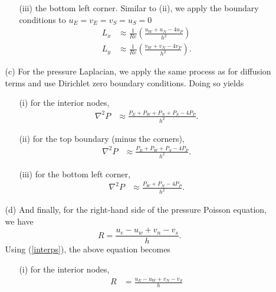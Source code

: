 \documentclass{article}
\begin{document}
\begin{itemize}
\begin{itemize}
\begin{itemize}
            \item[(iii)] the bottom left corner. Similar to (ii), we apply the boundary conditions to $u_E = v_E = v_S = u_S = 0$
            \begin{align*}
                L_x &\approx \frac{1}{Re}\left(\frac{u_W + u_N - 4u_P}{h^2}\right)\\
                L_y &\approx \frac{1}{Re}\left(\frac{v_W + v_N - 4v_P}{h^2}\right).
            \end{align*}
        \end{itemize}

        \item[(c)] For the pressure Laplacian, we apply the same process as for diffusion terms and use Dirichlet zero boundary conditions. Doing so yields
            \begin{itemize}
            \item[(i)] for the interior nodes, 
            \begin{align*}
                \nabla^2P &\approx \frac{P_E + P_W + P_N + P_S - 4P_P}{h^2}.
            \end{align*}

            \item[(ii)] for the top boundary (minus the corners),
            \begin{align*}
                \nabla^2P &\approx \frac{P_E + P_W + P_S - 4P_P}{h^2}.
            \end{align*}

            \item[(iii)] for the bottom left corner,
            \begin{align*}
                \nabla^2P &\approx \frac{P_W + P_N - 4P_P}{h^2}.
            \end{align*}
        \end{itemize}

        \item[(d)] And finally, for the right-hand side of the pressure Poisson equation, we have
        \[R = \frac{u_e - u_w + v_n - v_s}{h}.\]
        Using (\ref{interps}), the above equation becomes
            \begin{itemize}
                \item[(i)] for the interior nodes, 
                \begin{align*}
                    R &= \frac{u_E - u_W + v_N - v_S}{h}
                \end{align*}



\end{itemize}
\end{itemize}
\end{itemize}
\end{document}
